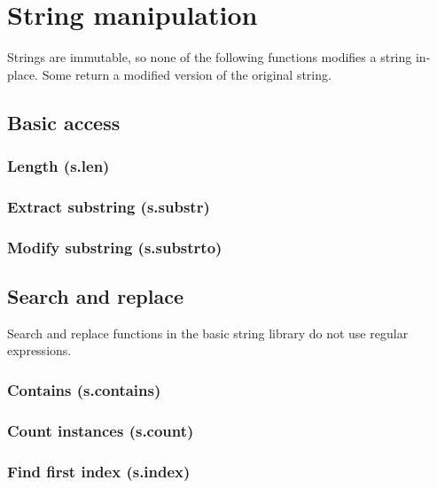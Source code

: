 \documentclass{article}
\theoremstyle{definition}
\begin{document}
\pagebreak

\section{String manipulation}

Strings are immutable, so none of the following functions modifies a string in-place.  Some return a modified version of the original string.

\subsection{Basic access}

\subsubsection{Length (s.len)}

\subsubsection{Extract substring (s.substr)}

\subsubsection{Modify substring (s.substrto)}

\subsection{Search and replace}

Search and replace functions in the basic string library do not use regular expressions.

\subsubsection{Contains (s.contains)}

\subsubsection{Count instances (s.count)}

\subsubsection{Find first index (s.index)}
\end{document}
